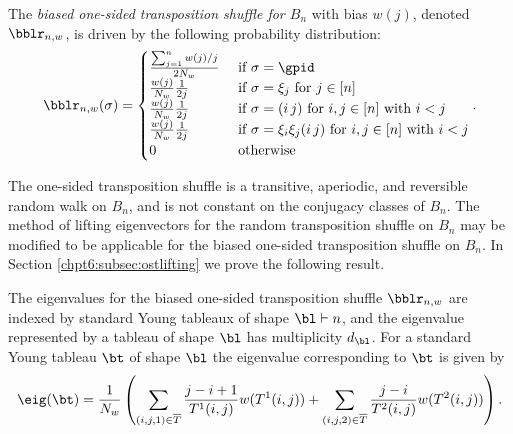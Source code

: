 \documentclass[11pt]{report}
\begin{document}
\begin{defn}
	The \emph{biased one-sided transposition shuffle for $B_{n}$} with bias $w(j)$, denoted $\bblr_{n,w}$,  is driven by the following probability distribution:
	\begin{eqnarray}
	\bblr_{n,w}( \sigma ) = \begin{cases}
	\frac{\sum_{j=1}^{n}w(j)/j}{2N_{w}} & \textnormal{ if } \sigma = \gpid \\
	\frac{w(j)}{N_{w}} \frac{1}{2j}& \textnormal{ if } \sigma = \xi_{j} \textnormal{ for } j \in [n] \\
	\frac{w(j)}{N_{w}} \frac{1}{2j}& \textnormal{ if } \sigma = (i \, j)  \textnormal{ for } i,j \in [n] \textnormal{ with } i <j\\
	\frac{w(j)}{N_{w}} \frac{1}{2j} & \textnormal{ if } \sigma = \xi_{i} \xi_{j} (i \, j)  \textnormal{ for } i,j \in [n] \textnormal{ with } i< j \\
	0 & \textnormal{ otherwise }
	\end{cases} .
	\end{eqnarray}
\end{defn}
The one-sided transposition shuffle is a transitive, aperiodic, and reversible random walk on  $B_{n}$, and is not constant on the conjugacy classes of $B_{n}$.  The method of lifting eigenvectors for the random transposition shuffle on $B_{n}$ may be modified to be applicable for the biased one-sided transposition shuffle on $B_{n}$. 
In Section \ref{chpt6:subsec:ostlifting} we prove the following result.

\begin{thm}
	\label{chpt6:thm:lreig}
	The eigenvalues for the biased one-sided transposition shuffle $\bblr_{n,w}$ are indexed by standard Young tableaux of shape $\bl \vdash n$, and the eigenvalue represented by a tableau of shape $\bl$ has multiplicity $d_{\bl}$. For a standard Young tableau $\bt$ of shape $\bl$ the eigenvalue 
	corresponding to $\bt$ is given by	
	\[\eig(\bt) = \frac{1}{N_{w}} \left(\sum_{(i,j,1) \in \overline{T}} \frac{j-i+1}{T^{1}(i,j)} w(T^{1}(i,j)) +\sum_{(i,j,2) \in \overline{T}} \frac{j-i}{T^{2}(i,j)} w(T^{2}(i,j)) \right).\]
\end{thm}
\end{document}
